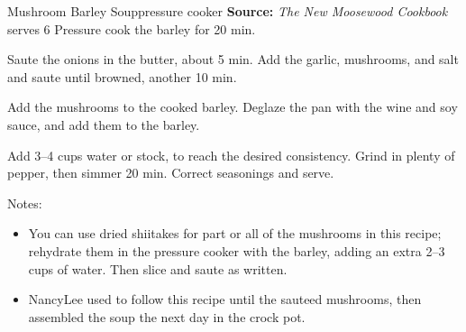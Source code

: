 \begin{recipe}[]{Mushroom Barley Soup}{pressure cooker \hfill }%
 {\textbf{Source:} \textit{The New Moosewood Cookbook} \hfill serves 6}
 Pressure cook the barley for 20 min.

 Saute the onions in the butter, about 5 min. Add the garlic, mushrooms, and salt and saute until browned, another 10 min.

 Add the mushrooms to the cooked barley. Deglaze the pan with the wine and soy sauce, and add them to the barley.

 Add 3--4 cups water or stock, to reach the desired consistency. Grind in plenty of pepper, then simmer 20 min. Correct seasonings and serve.

 \freeform Notes:
 \begin{itemize}
  \item You can use dried shiitakes for part or all of the mushrooms in this recipe; rehydrate them in the pressure cooker with the barley, adding an extra 2--3 cups of water. Then slice and saute as written.
  \item NancyLee used to follow this recipe until the sauteed mushrooms, then assembled the soup the next day in the crock pot.
 \end{itemize}
\end{recipe}
